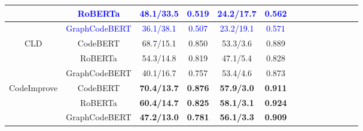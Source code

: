 \begin{table}[htb!]
{\begin{tabular}{ccccccccc ccccc}
   & \textcolor{blue}{RoBERTa} &\textcolor{blue}{48.1/33.5} &\textcolor{blue}{0.519} & \textcolor{blue}{24.2/17.7}&   \textcolor{blue}{0.562} \\\cline
    
    & \textcolor{blue}{GraphCodeBERT} &\textcolor{blue}{36.1/38.1} & \textcolor{blue}{0.507}& \textcolor{blue}{23.2/19.1}&\textcolor{blue}{0.571}  \\\hline

    

    \multirow{3}{*}{ CLD} & CodeBERT  & 68.7/15.1& 0.850& 53.3/3.6& 0.889 \\\cline

    & RoBERTa &54.3/14.8 &0.819 &47.1/5.4 &  0.828  \\\cline

    & GraphCodeBERT &40.1/16.7 &0.757 &53.4/4.6 & 0.873 \\\hline

    \multirow{3}{*}{ CodeImprove} & CodeBERT  &\textbf{70.4/13.7} & \textbf{0.876}&\textbf{57.9/3.0} &\textbf{0.911}  \\\cline

    & RoBERTa &\textbf{60.4/14.7} &\textbf{0.825} & \textbf{58.1/3.1}&  \textbf{0.924}  \\\cline

    & GraphCodeBERT &\textbf{47.2/13.0} &\textbf{0.781} &\textbf{56.1/3.3} &\textbf{0.909}  \\\hline

  
\end{tabular}}
\end{table}